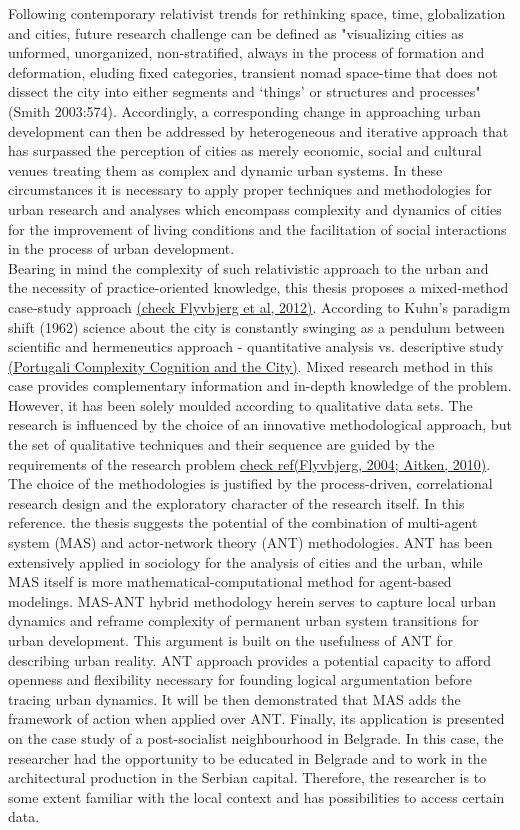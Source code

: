 \documentclass[11pt]{report}
\begin{document}
Following contemporary relativist trends for rethinking space, time, globalization and cities, future research challenge can be defined as "visualizing cities as unformed, unorganized, non-stratified, always in the process of formation and deformation, eluding fixed categories, transient nomad space-time that does not dissect the city into either segments and ‘things’ or structures and processes" (Smith 2003:574). Accordingly, a corresponding change in approaching urban development can then be addressed by heterogeneous and iterative approach that has surpassed the perception of cities as merely economic, social and cultural venues treating them as complex and dynamic urban systems. In these circumstances it is necessary to apply proper techniques and methodologies for urban research and analyses which encompass complexity and dynamics of cities for the improvement of living conditions and the facilitation of social interactions in the process of urban development. 
\\
Bearing in mind the complexity of such relativistic approach to the urban and the necessity of practice-oriented knowledge, this thesis proposes a mixed-method case-study approach \href{}{(check Flyvbjerg et al, 2012)}. According to Kuhn's paradigm shift (1962) science about the city is constantly swinging as a pendulum between scientific and hermeneutics approach - quantitative analysis vs. descriptive study \href{}{(Portugali Complexity Cognition and the City)}. Mixed research method in this case provides complementary information and in-depth knowledge of the problem. However, it has been solely moulded according to qualitative data sets. The research is influenced by the choice of an innovative methodological approach,  but  the  set of qualitative techniques  and  their  sequence  are  guided by the requirements of the research problem \href{}{check ref(Flyvbjerg, 2004; Aitken, 2010)}.
\\
The choice of the methodologies is justified by the process-driven, correlational research design and the exploratory character of the research itself. In this reference. the thesis suggests the potential of the combination of multi-agent system (MAS) and actor-network theory (ANT) methodologies. ANT has been extensively applied in sociology for the analysis of cities and the urban, while MAS itself is more mathematical-computational method for agent-based modelings. MAS-ANT hybrid methodology  herein serves to capture local urban dynamics and reframe complexity of permanent urban system transitions for urban development. This argument is built on the usefulness of ANT for describing urban reality. ANT approach provides a potential capacity to afford openness and flexibility necessary for founding logical argumentation before tracing urban dynamics. It will be then demonstrated that MAS adds the framework of action when applied over ANT. Finally, its application is presented on the case study of a post-socialist neighbourhood in Belgrade. In this case, the researcher had the opportunity to be educated in Belgrade and to work in the architectural production in the Serbian capital. Therefore, the  researcher is  to  some  extent  familiar  with  the  local  context  and has possibilities to access certain data.
\end{document}

